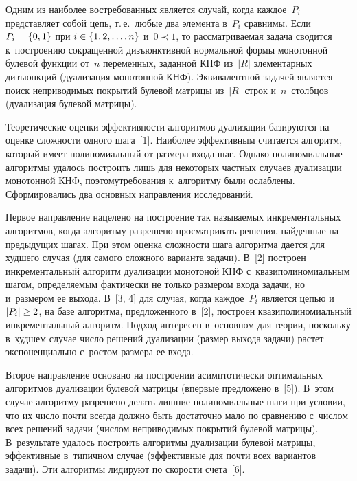 \begin{multicols}{2}
    Одним из наиболее востребованных является случай, когда каждое~$P_i$  
представляет собой цепь, т.\,е.\ любые два элемента в~$P_i$ сравнимы. Если 
$P_i\hm= \{0,1\}$ при $i\hm\in \{1,2,\ldots ,n\}$ и~$0\prec 1$, то 
рассматриваемая задача сводится к~по\-стро\-ению сокращенной дизъюнктивной 
нормальной формы монотонной булевой функ\-ции от~$n$ переменных, 
заданной КНФ из~$\vert R\vert$ 
элементарных дизъюнкций (дуализация монотонной КНФ). Эквивалентной 
задачей является поиск неприводимых покрытий булевой мат\-ри\-цы из~$\vert 
R\vert$ строк и~$n$~столб\-цов (дуализация булевой мат\-рицы).
    
    Теоретические оценки эффективности алгоритмов дуализации базируются 
на оценке сложности одного шага~[1]. Наиболее эффективным считается 
алгоритм, который имеет полиномиальный от размера входа шаг. Однако 
полиномиальные алгоритмы удалось построить лишь для некоторых частных 
случаев дуализации монотонной КНФ, поэтому\linebreak требования к~алгоритму были 
ослаблены. Сформировались два основных направления исследований. 
    
    Первое направление нацелено на построение так называемых 
инкрементальных алгоритмов, когда алгоритму разрешено просматривать 
решения, найденные на предыдущих шагах. При этом оценка сложности шага 
алгоритма дается для худшего случая (для самого сложного варианта задачи). 
В~[2] построен инкрементальный алгоритм дуализации монотоной КНФ 
с~квазиполиномиальным шагом, определяемым фактически не только 
размером входа задачи, но и~размером ее выхода. В~[3, 4] для случая, когда 
каждое~$P_i$ является цепью и~$\vert P_i\vert \hm\geq 2$, на базе алгоритма, 
предложенного в~[2], построен квазиполиномиальный инкрементальный 
алгоритм. Подход интересен в~основном для теории, поскольку в~худшем 
случае число решений дуализации (размер выхода задачи) растет 
экспоненциально с~ростом размера ее входа. 
    
    Второе направление основано на построении асимптотически 
оптимальных алгоритмов дуализации булевой матрицы (впервые предложено 
в~[5]). В~этом случае алгоритму разрешено делать лишние полиномиальные 
шаги при условии, что их чис\-ло почти всегда должно быть достаточно мало по 
сравнению с~числом всех решений задачи (числом неприводимых покрытий 
булевой матрицы). В~результате удалось построить алгоритмы дуализации 
булевой матрицы, эффективные в~типичном случае (эффективные для почти 
всех вариантов задачи). Эти алгоритмы   лидируют по скорости счета~[6].
    

\end{multicols}

